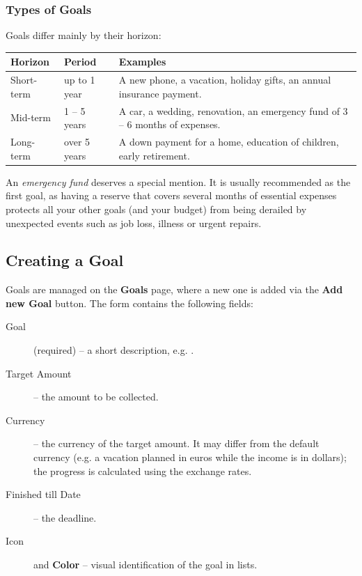 \subsubsection{Types of Goals}

Goals differ mainly by their horizon:

\begin{center}
\small
\begin{tabularx}{\textwidth}{|l|l|X|}
  \hline
  \textbf{Horizon} & \textbf{Period} & \textbf{Examples} \\
  \hline
  Short-term & up to 1 year & A new phone, a vacation, holiday gifts, an annual insurance
  payment. \\
  \hline
  Mid-term & 1 -- 5 years & A car, a wedding, renovation, an emergency fund of 3 -- 6 months
  of expenses. \\
  \hline
  Long-term & over 5 years & A down payment for a home, education of children, early
  retirement. \\
  \hline
\end{tabularx}
\end{center}

\noindent An \emph{emergency fund} deserves a special mention. It is usually recommended as
the first goal, as having a reserve that covers several months of essential expenses protects
all your other goals (and your budget) from being derailed by unexpected events such as job
loss, illness or urgent repairs.


\subsection{Creating a Goal}

Goals are managed on the \textbf{Goals} page, where a new one is added via the
\textbf{Add new Goal} button. The form contains the following fields:

\begin{description}
  \item[Goal] (required) -- a short description, e.g. .
  \item[Target Amount] -- the amount to be collected.
  \item[Currency] -- the currency of the target amount. It may differ from the default
  currency (e.g. a vacation planned in euros while the income is in dollars); the progress is
  calculated using the exchange rates.
  \item[Finished till Date] -- the deadline.
  \item[Icon] and \textbf{Color} -- visual identification of the goal in lists.
\end{description}

